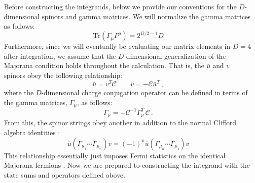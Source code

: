 \documentclass[11pt,letter]{article}
\begin{document}
Before constructing the integrands, below we provide our conventions for the $D$-dimensional spinors and gamma matrices. We will normalize the gamma matrices as follows:
\begin{equation}
\text{Tr}(\Gamma_\mu\Gamma^\mu) = 2^{D/2-1}D
\end{equation}
Furthermore, since we will eventually be evaluating our matrix elements in $D=4$ after integration, we assume that the $D$-dimensional generalization of the Majorana condition holds throughout the calculation. That is, the $\bar{u}$ and $v$ spinors obey the following relationship:
\begin{equation}
\bar{u} = v^T \mathcal{C} \qquad v = - \mathcal{C} \bar{u}^T\,,
\end{equation}
where the $D$-dimensional charge conjugation operator can be defined in terms of the gamma matrices, $\Gamma_\mu$, as follows:
\begin{equation}
\Gamma_\mu = - \mathcal{C} ^{-1}\Gamma_\mu ^T\, \mathcal{C}\,.
\end{equation}
From this, the spinor strings obey another in addition to the normal Clifford algebra identities \cite{Chiodaroli2013upa}:
\begin{equation}
\bar{u}(\Gamma_{\mu_1} \cdots \Gamma_{\mu _n}) v =(-1)^n \bar{u} (\Gamma_{\mu_n} \cdots \Gamma_{\mu _1} )v
\end{equation}
This relationship essentially just imposes Fermi statistics on the identical Majorana fermions \cite{Carrasco:2023vjg}. Now we are prepared to constructing the integrand with the state sums and operators defined above. 
\end{document}

